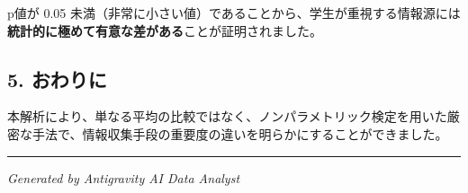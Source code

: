 \documentclass[
]{article}
\begin{document}
p値が 0.05
未満（非常に小さい値）であることから、学生が重視する情報源には\textbf{統計的に極めて有意な差がある}ことが証明されました。

\subsection{5. おわりに}\label{ux304aux308fux308aux306b}

本解析により、単なる平均の比較ではなく、ノンパラメトリック検定を用いた厳密な手法で、情報収集手段の重要度の違いを明らかにすることができました。

\begin{center}\rule{0.5\linewidth}{0.5pt}\end{center}

\emph{Generated by Antigravity AI Data Analyst}
\end{document}
